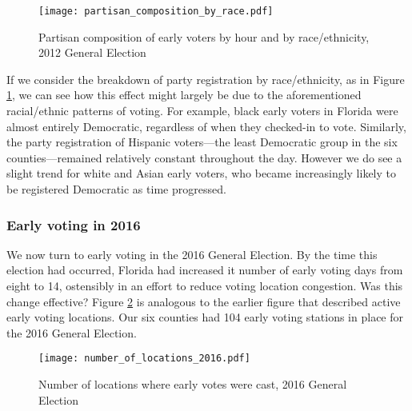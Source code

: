 \documentclass[12pt,titlepage]{article}
\begin{document}
\begin{figure}[!ht]
\caption{Partisan composition of early voters by hour and by race/ethnicity, 2012
  General Election}
  \label{fig:party2012}
  \centering
    \centering\texttt{[image: partisan\_composition\_by\_race.pdf]}
\end{figure}

%

If we consider the breakdown of party registration by race/ethnicity,
as in Figure \ref{fig:party2012}, we can see how this effect might
largely be due to the aforementioned racial/ethnic patterns of voting.
For example, black early voters in Florida were almost entirely
Democratic, regardless of when they checked-in to vote.  Similarly,
the party registration of Hispanic voters---the least Democratic group
in the six counties---remained relatively constant throughout the day.
However we do see a slight trend for white and Asian early voters, who
became increasingly likely to be registered Democratic as time
progressed.


\subsubsection*{Early voting in 2016}

We now turn to early voting in the 2016 General Election.  By the time
this election had occurred, Florida had increased it number of early
voting days from eight to 14, ostensibly in an effort to reduce voting
location congestion. Was this change effective?  Figure
\ref{fig:nrlocs2016} is analogous to the earlier figure that described
active early voting locations. Our six counties had 104 early voting
stations in place for the 2016 General Election.


\begin{figure}[!ht]
  \caption{Number of locations where early votes were cast, 2016 General
    Election}
  \label{fig:nrlocs2016}
  \centering
    \centering\texttt{[image: number\_of\_locations\_2016.pdf]}
\end{figure}
\end{document}
